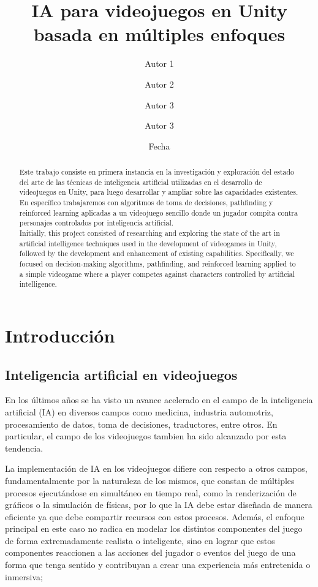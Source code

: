 \documentclass{article}
\title{IA para videojuegos en Unity basada en múltiples enfoques}
\author{Autor 1 \and Autor 2 \and Autor 3 \and Autor 3}
\date{Fecha}
\begin{document}
\maketitle

\begin{abstract}

    Este trabajo consiste en primera instancia en la investigación y exploración del estado del arte de las técnicas de inteligencia artificial utilizadas en el desarrollo de videojuegos en Unity, para luego desarrollar y ampliar sobre las capacidades existentes. En específico trabajaremos con algoritmos de toma de decisiones, pathfinding y reinforced learning aplicadas a un videojuego sencillo donde un jugador compita contra personajes controlados por inteligencia artificial.\\

    Initially, this project consisted of researching and exploring the state of the art in artificial intelligence techniques used in the development of videogames in Unity, followed by the development and enhancement of existing capabilities. Specifically, we focused on decision-making algorithms, pathfinding, and reinforced learning applied to a simple videogame where a player competes against characters controlled by artificial intelligence.

\end{abstract}

\section{Introducción}

\subsection{Inteligencia artificial en videojuegos}

En los últimos años se ha visto un avance acelerado en el campo de la inteligencia artificial (IA) en diversos campos como medicina, industria automotriz, procesamiento de datos, toma de decisiones, traductores, entre otros. En particular, el campo de los videojuegos tambien ha sido alcanzado por esta tendencia.

La implementación de IA en los videojuegos difiere con respecto a otros campos, fundamentalmente por la naturaleza de los mismos, que constan de múltiples procesos ejecutándose en simultáneo en tiempo real, como la renderización de gráficos o la simulación de físicas, por lo que la IA debe estar diseñada de manera eficiente ya que debe compartir recursos con estos procesos. Además, el enfoque principal en este caso no radica en modelar los distintos componentes del juego de forma extremadamente realista o inteligente, sino en lograr que estos componentes reaccionen a las acciones del jugador o eventos del juego de una forma que tenga sentido y contribuyan a crear una experiencia más entretenida o inmersiva;
\end{document}
